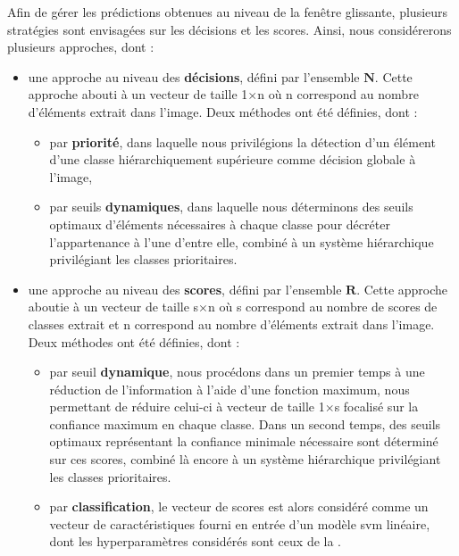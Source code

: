 Afin de gérer les prédictions obtenues au niveau de la fenêtre glissante, plusieurs stratégies sont envisagées sur les décisions et les scores. Ainsi, nous considérerons plusieurs approches, dont :
\begin{itemize}
    \item   une approche au niveau des \textbf{décisions}, défini par l'ensemble $\mathbf{N}$. Cette approche abouti à un vecteur de taille 1$\times$n où n correspond au nombre d'éléments extrait dans l'image. Deux méthodes ont été définies, dont : 
            \begin{itemize}
                \item par \textbf{priorité}, dans laquelle nous privilégions la détection d'un élément d'une classe hiérarchiquement supérieure comme décision globale à l'image,
                \item par seuils \textbf{dynamiques}, dans laquelle nous déterminons des seuils optimaux d'éléments nécessaires à chaque classe pour décréter l'appartenance à l'une d'entre elle, combiné à un système hiérarchique privilégiant les classes prioritaires.
            \end{itemize}
    \item   une approche au niveau des \textbf{scores}, défini par l'ensemble $\mathbf{R}$. Cette approche aboutie à un vecteur de taille s$\times$n où s correspond au nombre de scores de classes extrait et n correspond au nombre d'éléments extrait dans l'image. Deux méthodes ont été définies, dont : 
            \begin{itemize}
                \item par seuil \textbf{dynamique}, nous procédons dans un premier temps à une réduction de l'information à l'aide d'une fonction maximum, nous permettant de réduire celui-ci à vecteur de taille 1$\times$s focalisé sur la confiance maximum en chaque classe. Dans un second temps, des seuils optimaux représentant la confiance minimale nécessaire sont déterminé sur ces scores, combiné là encore à un système hiérarchique privilégiant les classes prioritaires.
                \item par \textbf{classification}, le vecteur de scores est alors considéré comme un vecteur de caractéristiques fourni en entrée d'un modèle \gls{svm} linéaire, dont les hyperparamètres considérés sont ceux de la .
            \end{itemize}
\end{itemize}\par

